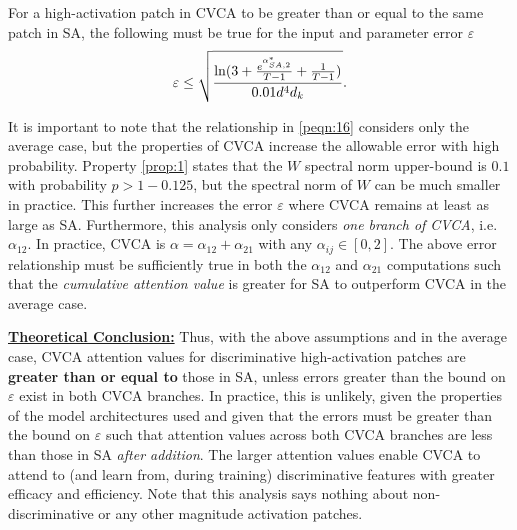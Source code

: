 For a high-activation patch in CVCA to be greater than or equal to the same patch in SA, the following must be true for the input and parameter error $\varepsilon$
\begin{equation}
    \varepsilon \leq \sqrt{\frac{\ln (3 + \frac{e^{\alpha^*_{SA,2}}}{T-1} + \frac{1}{T-1})}{0.01 d^4 d_k}}. \\
\label{peqn:16}
\end{equation}

It is important to note that the relationship in \ref{peqn:16} considers only the average case, but the properties of CVCA increase the allowable error with high probability. Property \ref{prop:1} states that the $W$ spectral norm upper-bound is $0.1$ with probability $p > 1 - 0.125$, but the spectral norm of $W$ can be much smaller in practice. This further increases the error $\varepsilon$ where CVCA remains at least as large as SA. Furthermore, this analysis only considers \emph{one branch of CVCA}, i.e. $\alpha_{12}$. In practice, CVCA is $\alpha = \alpha_{12} + \alpha_{21}$ with any $\alpha_{ij} \in [0,2]$. The above error relationship must be sufficiently true in both the $\alpha_{12}$ and $\alpha_{21}$ computations such that the \textit{cumulative attention value} is greater for SA to outperform CVCA in the average case.

\textbf{\underline{Theoretical Conclusion:}} Thus, with the above assumptions and in the average case, CVCA attention values for discriminative high-activation patches are \textbf{greater than or equal to} those in SA, unless errors greater than the bound on  $\varepsilon$ exist in both CVCA branches. In practice, this is unlikely, given the properties of the model architectures used \cite{xiong2020layer} and given that the errors must be greater than the bound on $\varepsilon$ such that attention values across both CVCA branches are less than those in SA \textit{after addition}. The larger attention values enable CVCA to attend to (and learn from, during training) discriminative features with greater efficacy and efficiency. Note that this analysis says nothing about non-discriminative or any other magnitude activation patches.

